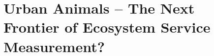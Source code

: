 \documentclass[12pt]{article}
\begin{document}
\section{Urban Animals -- The Next Frontier of Ecosystem Service Measurement?}\label{sec:animals}
%
\end{document}
